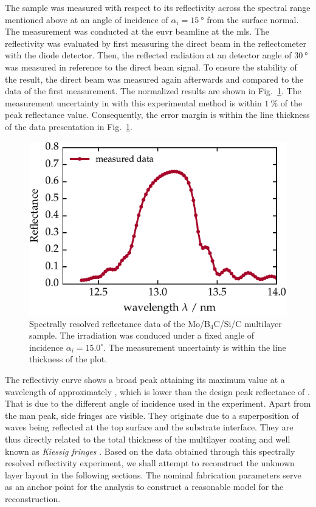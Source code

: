 The sample was measured with respect to its reflectivity across the spectral range mentioned above at an angle of incidence of $\alpha_i=\SI{15}{\degree}$ from the surface normal. The measurement was conducted at the \gls{euvr} beamline at the \gls{mls}. The reflectivity was evaluated by first measuring the direct beam in the reflectometer with the diode detector. Then, the reflected radiation at an detector angle of $\SI{30}{\degree}$ was measured in reference to the direct beam signal. To ensure the stability of the result, the direct beam was measured again afterwards and compared to the data of the first measurement. The normalized results are shown in Fig.~\ref{ch_spec:fig_ptb17_reflectance_AOI_15}. The measurement uncertainty in with this experimental method is within $\SI{1}{\percent}$ of the peak reflectance value. Consequently, the error margin is within the line thickness of the data presentation in Fig.~\ref{ch_spec:fig_ptb17_reflectance_AOI_15}.
\begin{figure}[htbp]
\centering
\includegraphics{img/PTB17_reflectance_AOI_15}
\caption{Spectrally resolved reflectance data of the Mo/B$_4$C/Si/C multilayer sample. The irradiation was conduced under a fixed angle of incidence $\alpha_i = 15.0^\circ$. The measurement uncertainty is within the line thickness of the plot.}
\label{ch_spec:fig_ptb17_reflectance_AOI_15}
\end{figure}

The reflectiviy curve shows a broad peak attaining its maximum value at a wavelength of approximately , which is lower than the design peak reflectance of . That is due to the different angle of incidence used in the experiment. Apart from the man peak, side fringes are visible. They originate due to a superposition of waves being reflected at the top surface and the substrate interface. They are thus directly related to the total thickness of the multilayer coating and well known as \emph{Kiessig fringes} \cite{kiessig_interferenz_1931}. Based on the data obtained through this spectrally resolved reflectivity experiment, we shall attempt to reconstruct the unknown layer layout in the following sections. The nominal fabrication parameters serve as an anchor point for the analysis to construct a reasonable model for the reconstruction.

